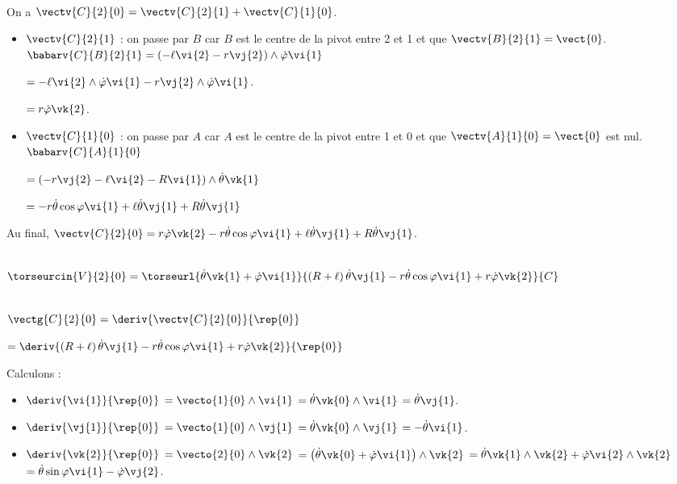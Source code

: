 \ifprof ~\\
On a $\vectv{C}{2}{0}= \vectv{C}{2}{1}+\vectv{C}{1}{0}$.
\begin{itemize}
\item $\vectv{C}{2}{1}$ : on passe par $B$ car $B$ est le centre de la pivot entre 2 et 1 et que $\vectv{B}{2}{1}=\vect{0}$. 
$\babarv{C}{B}{2}{1} =\left(-\ell\vi{2}-r\vj{2} \right)\wedge \dot{\varphi}\vi{1} $ 

$=-\ell\vi{2}\wedge \dot{\varphi}\vi{1}-r\vj{2} \wedge \dot{\varphi}\vi{1}$.

$=r\dot{\varphi}\vk{2}$.

\item $\vectv{C}{1}{0}$ : on passe par $A$ car $A$ est le centre de la pivot entre 1 et 0 et que $\vectv{A}{1}{0}=\vect{0}$ est nul. 
$\babarv{C}{A}{1}{0}$ 

$=\left(-r\vj{2}-\ell\vi{2}-R\vi{1}\right)\wedge \dot{\theta}\vk{1}$

$=-r\dot{\theta}\cos\varphi\vi{1}+\ell\dot{\theta}\vj{1}+R\dot{\theta}\vj{1}$ %
\end{itemize}

Au final, 
 $\vectv{C}{2}{0}=r\dot{\varphi}\vk{2}-r\dot{\theta}\cos\varphi\vi{1}+\ell\dot{\theta}\vj{1}+R\dot{\theta}\vj{1}$.
\else
\fi


\ifprof ~\\
$\torseurcin{V}{2}{0} = \torseurl{\dot{\theta}\vk{1}+ \dot{\varphi}\vi{1}}{\left(R+\ell\right)\dot{\theta}\vj{1} -r\dot{\theta}\cos\varphi \vi{1} + r\dot{\varphi}\vk{2}}{C}$
\else
\fi

\ifprof ~\\
 
 $\vectg{C}{2}{0} = \deriv{\vectv{C}{2}{0}}{\rep{0}}$
 
 $ = \deriv{\left(R+\ell\right)\dot{\theta}\vj{1} -r\dot{\theta}\cos\varphi \vi{1} + r\dot{\varphi}\vk{2}}{\rep{0}}$
 
 Calculons : 
\begin{itemize}
\item $\deriv{\vi{1}}{\rep{0}}$ $=\vecto{1}{0} \wedge \vi{1}$ $=\dot{\theta}\vk{0} \wedge \vi{1}$ $=\dot{\theta}\vj{1}$.
\item $\deriv{\vj{1}}{\rep{0}}$ $=\vecto{1}{0} \wedge \vj{1}$ $=\dot{\theta}\vk{0} \wedge \vj{1}$ $=-\dot{\theta}\vi{1}$.
\item $\deriv{\vk{2}}{\rep{0}}$ $=\vecto{2}{0} \wedge \vk{2}$ 
$=\left(\dot{\theta}\vk{0}+ \dot{\varphi}\vi{1} \right) \wedge \vk{2}$
$=\dot{\theta}\vk{1} \wedge \vk{2}+ \dot{\varphi}\vi{2}  \wedge \vk{2}$
$=\dot{\theta}\sin\varphi\vi{1}- \dot{\varphi}\vj{2}$.
\end{itemize}

